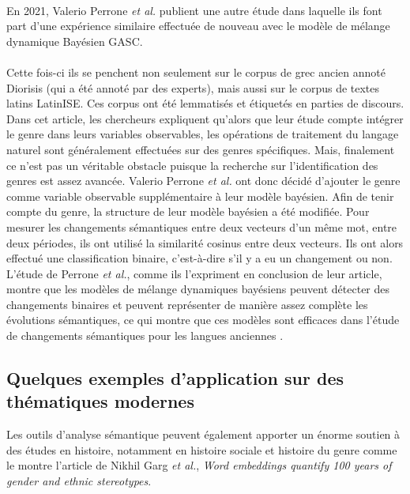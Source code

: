 \documentclass{article}
\begin{document}
\paragraph{}
En 2021, Valerio Perrone \textit{et al.} publient une autre étude \cite{perrone2021lexical} dans laquelle ils font part d’une expérience similaire effectuée de nouveau avec le modèle de mélange dynamique Bayésien GASC. 
\paragraph{}
Cette fois-ci ils se penchent non seulement sur le corpus de grec ancien annoté Diorisis (qui a été annoté par des experts), mais aussi sur le corpus de textes latins LatinISE. Ces corpus ont été lemmatisés et étiquetés en parties de discours. Dans cet article, les chercheurs expliquent qu’alors que leur étude compte intégrer le genre dans leurs variables observables, les opérations de traitement du langage naturel sont généralement effectuées sur des genres spécifiques. Mais, finalement ce n’est pas un véritable obstacle puisque la recherche sur l’identification des genres est assez avancée. Valerio Perrone \textit{et al.} ont donc décidé d’ajouter le genre comme variable observable supplémentaire à leur modèle bayésien. Afin de tenir compte du genre, la structure de leur modèle bayésien a été modifiée. Pour mesurer les changements sémantiques entre deux vecteurs d’un même mot, entre deux périodes, ils ont utilisé la similarité cosinus entre deux vecteurs. Ils ont alors effectué une classification binaire, c’est-à-dire s’il y a eu un changement ou non. L’étude de Perrone \textit{et al.}, comme ils l'expriment en conclusion de leur article, montre que les modèles de mélange dynamiques bayésiens peuvent détecter des changements binaires et peuvent représenter de manière assez complète les évolutions sémantiques, ce qui montre que ces modèles sont efficaces dans l’étude de changements sémantiques pour les langues anciennes \cite{perrone2021lexical}.

\subsection{Quelques exemples d'application sur des thématiques modernes}
Les outils d’analyse sémantique peuvent également apporter un énorme soutien à des études en histoire, notamment en histoire sociale et histoire du genre comme le montre l’article de Nikhil Garg \textit{et al.}, \textit{Word embeddings quantify 100 years of gender and ethnic stereotypes}. 
\end{document}
